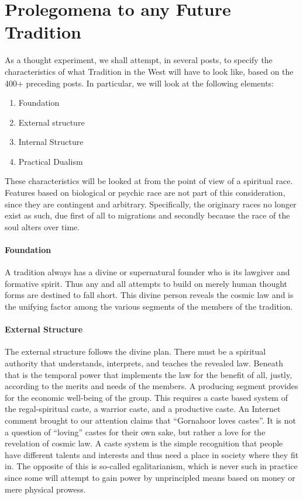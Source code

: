 \section{Prolegomena to any Future Tradition}

As a thought experiment, we shall attempt, in several posts, to specify the characteristics of what Tradition in the West will have to look like, based on the 400+ preceding posts. In particular, we will look at the following elements:

\begin{enumerate}
\item Foundation 
\item External structure 
\item Internal Structure 
\item Practical Dualism 
\end{enumerate}
These characteristics will be looked at from the point of view of a spiritual race. Features based on biological or psychic race are not part of this consideration, since they are contingent and arbitrary. Specifically, the originary races no longer exist as such, due first of all to migrations and secondly because the race of the soul alters over time.

\paragraph{Foundation}
A tradition always has a divine or supernatural founder who is its lawgiver and formative spirit. Thus any and all attempts to build on merely human thought forms are destined to fall short. This divine person reveals the cosmic law and is the unifying factor among the various segments of the members of the tradition.

\paragraph{External Structure}
The external structure follows the divine plan. There must be a spiritual authority that understands, interprets, and teaches the revealed law. Beneath that is the temporal power that implements the law for the benefit of all, justly, according to the merits and needs of the members. A producing segment provides for the economic well-being of the group. This requires a caste based system of the regal-spiritual caste, a warrior caste, and a productive caste. An Internet comment brought to our attention claims that “Gornahoor loves castes”. It is not a question of “loving” castes for their own sake, but rather a love for the revelation of cosmic law. A caste system is the simple recognition that people have different talents and interests and thus need a place in society where they fit in. The opposite of this is so-called egalitarianism, which is never such in practice since some will attempt to gain power by unprincipled means based on money or mere physical prowess.

